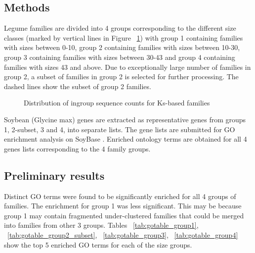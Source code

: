 \documentclass{article}
\begin{document}
		\subsection{Methods}
		Legume families are divided into 4 groups corresponding to the different size classes (marked by vertical lines in Figure ~\ref{fig:hist_lgf5_family_size_groups}) with group 1 containing families with sizes between 0-10, group 2 containing families with sizes between 10-30, group 3 containing families with sizes between 30-43 and group 4 containing families with sizes 43 and above. Due to exceptionally large number of families in group 2, a subset of families in group 2 is selected for further processing. The dashed lines show the subset of group 2 families.
		
		\begin{figure}[h!]
			\caption{Distribution of ingroup sequence counts for Ks-based families}
			\label{fig:hist_lgf5_family_size_groups}
		\end{figure}
	
		Soybean (Glycine max) genes are extracted as representative genes from groups 1, 2-subset, 3 and 4, into separate lists. The gene lists are submitted for GO enrichment analysis on SoyBase \citep{grant2009soybase}. Enriched ontology terms are obtained for all 4 genes lists corresponding to the 4 family groups.
		
		\subsection{Preliminary results}
		Distinct GO terms were found to be significantly enriched for all 4 groups of families. The enrichment for group 1 was less significant. This may be because group 1 may contain fragmented under-clustered families that could be merged into families from other 3 groups. Tables ~\ref{tab:gotable_group1}, ~\ref{tab:gotable_group2_subset}, ~\ref{tab:gotable_group3}, ~\ref{tab:gotable_group4} show the top 5 enriched GO terms for each of the size groups.
		
\end{document}
